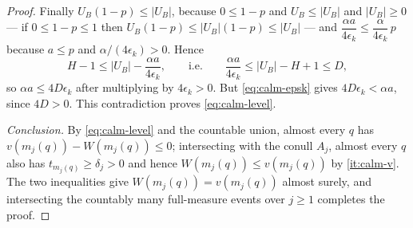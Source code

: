 \begin{proof}
Finally $U_B(1-p)\le|U_B|$, because $0\le1-p$ and $U_B\le|U_B|$ and
$|U_B|\ge0$ --- if $0\le1-p\le1$ then
$U_B(1-p)\le|U_B|(1-p)\le|U_B|$ --- and
$\dfrac{\alpha a}{4\epsilon_k}\le\dfrac{\alpha}{4\epsilon_k}\,p$ because
$a\le p$ and $\alpha/(4\epsilon_k)>0$. Hence
\[
  H-1\le|U_B|-\frac{\alpha a}{4\epsilon_k},
  \qquad\text{i.e.}\qquad
  \frac{\alpha a}{4\epsilon_k}\le|U_B|-H+1\le D ,
\]
so $\alpha a\le4D\epsilon_k$ after multiplying by $4\epsilon_k>0$. But
\eqref{eq:calm-epsk} gives $4D\epsilon_k<\alpha a$, since $4D>0$. This
contradiction proves \eqref{eq:calm-level}.

\emph{Conclusion.} By \eqref{eq:calm-level} and the countable union, almost
every $q$ has $v(m_j(q))-W(m_j(q))\le0$; intersecting with the conull $A_j$,
almost every $q$ also has $t_{m_j(q)}\ge\delta_j>0$ and hence
$W(m_j(q))\le v(m_j(q))$ by \ref{it:calm-v}. The two inequalities give
$W(m_j(q))=v(m_j(q))$ almost surely, and intersecting the countably many
full-measure events over $j\ge1$ completes the proof.
\end{proof}
